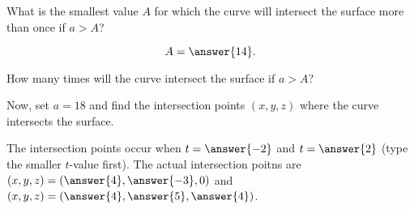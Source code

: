 \documentclass{ximera}
\begin{document}
\begin{exercise}
\begin{exercise}
What is the smallest value $A$ for which the curve will intersect the surface more than once if $a>A$?

\[
A = \answer{14}.
\] 

How many times will the curve intersect the surface if $a>A$?

\begin{multipleChoice}
\end{multipleChoice}

\begin{exercise}
Now, set $a=18$ and find the intersection points $(x,y,z)$ where the curve intersects the surface.

The intersection points occur when $t=\answer{-2}$ and $t=\answer{2}$ (type the smaller $t$-value first).  The actual intersection poitns are $(x,y,z) = \left(\answer{4},\answer{-3}, 0  \right)$ and $(x,y,z) = \left(\answer{4},\answer{5}, \answer{4}  \right)$.
\end{exercise}
\end{exercise}
\end{exercise}
\end{document}
